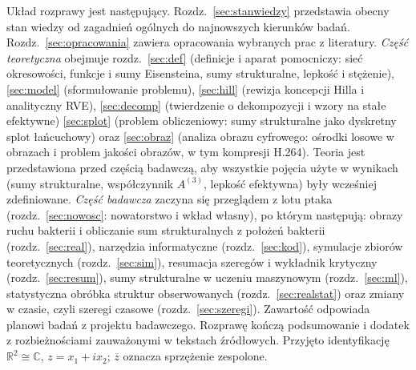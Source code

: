 \documentclass[12pt,a4paper,twoside,openright]{report}
\theoremstyle{definition}
\theoremstyle{remark}
\newcommand{\R}{\mathbb{R}}
\newcommand{\C}{\mathbb{C}}
\newcommand{\cc}[1]{\overline{#1}}
\newcommand{\ziel}[1]{{\color{green!50!black}#1}}
\begin{document}
Układ rozprawy jest następujący. \ziel{Rozdz.~\ref{sec:stanwiedzy} przedstawia obecny stan wiedzy od zagadnień ogólnych do najnowszych kierunków badań.} Rozdz.~\ref{sec:opracowania} zawiera opracowania wybranych prac z literatury. \emph{Część teoretyczna} obejmuje rozdz.~\ref{sec:def} (definicje i aparat pomocniczy: sieć okresowości, funkcje i sumy Eisensteina, sumy strukturalne, lepkość i stężenie), \ref{sec:model} (sformułowanie problemu), \ref{sec:hill} (rewizja koncepcji Hilla i analityczny RVE), \ref{sec:decomp} (twierdzenie o dekompozycji i wzory na stałe efektywne) \ziel{\ref{sec:splot} (problem obliczeniowy: sumy strukturalne jako dyskretny splot łańcuchowy)} oraz \ziel{\ref{sec:obraz} (analiza obrazu cyfrowego: ośrodki losowe w obrazach i problem jakości obrazów, w tym kompresji H.264)}. Teoria jest przedstawiona przed częścią badawczą, aby wszystkie pojęcia użyte w wynikach (sumy strukturalne, współczynnik $A^{(3)}$, lepkość efektywna) były wcześniej zdefiniowane. \emph{Część badawcza} zaczyna się przeglądem z lotu ptaka (rozdz.~\ref{sec:nowosc}: nowatorstwo i wkład własny), po którym następują: obrazy ruchu bakterii i obliczanie sum strukturalnych z położeń bakterii (rozdz.~\ref{sec:real}), narzędzia informatyczne (rozdz.~\ref{sec:kod}), symulacje zbiorów teoretycznych (rozdz.~\ref{sec:sim}), resumacja szeregów i wykładnik krytyczny (rozdz.~\ref{sec:resum}), sumy strukturalne w uczeniu maszynowym (rozdz.~\ref{sec:ml}), statystyczna obróbka struktur obserwowanych (rozdz.~\ref{sec:realstat}) oraz \ziel{zmiany w czasie, czyli szeregi czasowe (rozdz.~\ref{sec:szeregi})}. Zawartość odpowiada planowi badań z projektu badawczego. Rozprawę kończą podsumowanie i dodatek z rozbieżnościami zauważonymi w tekstach źródłowych. Przyjęto identyfikację $\R^2\cong\C$, $z=x_1+ix_2$; $\cc{z}$ oznacza sprzężenie zespolone.
\end{document}
